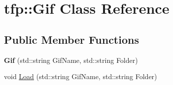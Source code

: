 \hypertarget{classtfp_1_1_gif}{}\section{tfp\+:\+:Gif Class Reference}
\label{classtfp_1_1_gif}
\subsection*{Public Member Functions}
\begin{DoxyCompactItemize}
\item 
\mbox{\label{classtfp_1_1_gif_a654b4e222b4591461ac7aacdaad189d0}} 
{\bfseries Gif} (std\+::string Gif\+Name, std\+::string Folder)
\item 
void \mbox{\hyperlink{classtfp_1_1_gif_a8311dffa4df0ec1c6f2ed6d88451aae8}{Load}} (std\+::string Gif\+Name, std\+::string Folder)
\end{DoxyCompactItemize}
